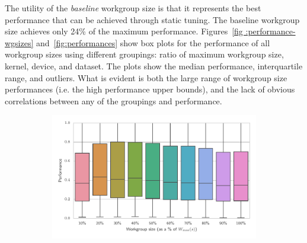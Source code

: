 \documentclass[nonatbib,preprint,nocopyrightspace,9pt]{sigplanconf}
\begin{document}
  The utility of the \emph{baseline} workgroup size is that it represents the best
  performance that can be achieved through static tuning. The baseline workgroup
  size achieves only 24\% of the maximum performance. Figures~\ref{fig
  :performance-wgsizes} and~\ref{fig:performances} show box plots for the
  performance of all workgroup sizes using different groupings: ratio of maximum
  workgroup size, kernel, device, and dataset. The plots show the median
  performance, interquartile range, and outliers. What is evident is both the
  large range of workgroup size performances (i.e. the high performance upper
  bounds), and the lack of obvious correlations between any of the groupings and
  performance.


  \begin{figure}
    \begin{subfigure}[h]{\columnwidth}
      \centering
      \includegraphics[width=\columnwidth]{img/performance_max_wgsize}
      \vspace{-1.5em} %
      \caption{}
      \label{fig:performance-max-wgsize}
    \end{subfigure}
    \\
    \begin{subfigure}[h]{.48\columnwidth}
      \centering

\end{subfigure}
\end{figure}
\end{document}

